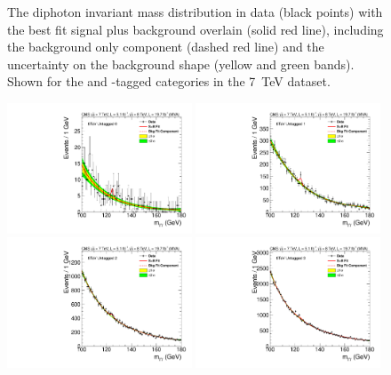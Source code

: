 \begin{figure}
  \caption{The diphoton invariant mass distribution in data (black points) with the best fit signal plus background overlain (solid red line), including the background only component (dashed red line) and the uncertainty on the background shape (yellow and green bands). Shown for the \VH and \ttH-tagged categories in the 7~TeV dataset.}
  \label{fig:bfres2}
\end{figure}

\begin{figure}
  \vspace{-1cm}
  \includegraphics[width=0.49\textwidth]{results/plots/mgg-cats/mgg_mva_nosub_ch2_cat0_8TeV.pdf}
  \includegraphics[width=0.49\textwidth]{results/plots/mgg-cats/mgg_mva_nosub_ch2_cat1_8TeV.pdf}
  \includegraphics[width=0.49\textwidth]{results/plots/mgg-cats/mgg_mva_nosub_ch2_cat2_8TeV.pdf}
  \includegraphics[width=0.49\textwidth]{results/plots/mgg-cats/mgg_mva_nosub_ch2_cat3_8TeV.pdf}

\end{figure}
